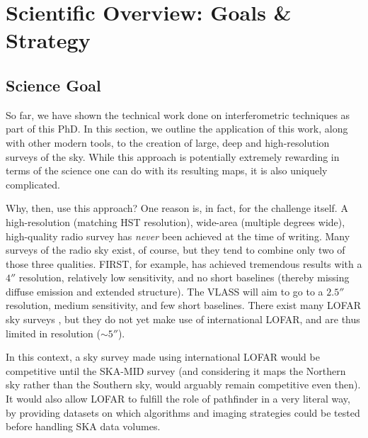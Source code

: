 \chapter{Scientific Overview: Goals \& Strategy}
\minitoc

\section{Science Goal}
\pg
So far, we have shown the technical work done on interferometric techniques as part of this PhD. In this section, we outline the application of this work, along with other modern tools, to the creation of large, deep and high-resolution surveys of the sky. While this approach is potentially extremely rewarding in terms of the science one can do with its resulting maps, it is also uniquely complicated.

\pg
Why, then, use this approach? One reason is, in fact, for the challenge itself. A high-resolution (matching HST resolution), wide-area (multiple degrees wide), high-quality radio survey has \emph{never} been achieved at the time of writing. Many surveys of the radio sky exist, of course, but they tend to combine only two of those three qualities. FIRST, for example, has achieved tremendous results with a $4''$ resolution, relatively low sensitivity, and no short baselines (thereby missing diffuse emission and extended structure). The VLASS  will aim to go to a $2.5''$ resolution, medium sensitivity, and few short baselines. There exist many LOFAR sky surveys , but they do not yet make use of international LOFAR, and are thus limited in resolution ($\sim 5''$).%

\pg
In this context, a sky survey made using international LOFAR would be competitive until the SKA-MID survey (and considering it maps the Northern sky rather than the Southern sky, would arguably remain competitive even then). It would also allow LOFAR to fulfill the role of pathfinder in a very literal way, by providing datasets on which algorithms and imaging strategies could be tested before handling SKA data volumes.

